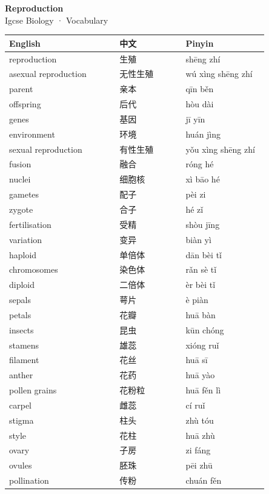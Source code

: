\documentclass[11pt]{article}
\begin{document}
\begin{center}
  {\LARGE\bfseries Reproduction}\\[0.35em]
  {\large Igcse Biology · Vocabulary}
\end{center}
\vspace{0.6em}

\begin{longtable}{@{}p{0.40\linewidth}p{0.24\linewidth}p{0.30\linewidth}@{}}
\toprule
\textbf{English} & \textbf{中文} & \textbf{Pinyin} \\
\midrule
\endhead
\bottomrule
\endlastfoot
reproduction & 生殖 & shēng zhí \\
asexual reproduction & 无性生殖 & wú xìng shēng zhí \\
parent & 亲本 & qīn běn \\
offspring & 后代 & hòu dài \\
genes & 基因 & jī yīn \\
environment & 环境 & huán jìng \\
sexual reproduction & 有性生殖 & yǒu xìng shēng zhí \\
fusion & 融合 & róng hé \\
nuclei & 细胞核 & xì bāo hé \\
gametes & 配子 & pèi zi \\
zygote & 合子 & hé zǐ \\
fertilisation & 受精 & shòu jīng \\
variation & 变异 & biàn yì \\
haploid & 单倍体 & dān bèi tǐ \\
chromosomes & 染色体 & rǎn sè tǐ \\
diploid & 二倍体 & èr bèi tǐ \\
sepals & 萼片 & è piàn \\
petals & 花瓣 & huā bàn \\
insects & 昆虫 & kūn chóng \\
stamens & 雄蕊 & xióng ruǐ \\
filament & 花丝 & huā sī \\
anther & 花药 & huā yào \\
pollen grains & 花粉粒 & huā fěn lì \\
carpel & 雌蕊 & cí ruǐ \\
stigma & 柱头 & zhù tóu \\
style & 花柱 & huā zhù \\
ovary & 子房 & zi fáng \\
ovules & 胚珠 & pēi zhū \\
pollination & 传粉 & chuán fěn \\

\end{longtable}
\end{document}
